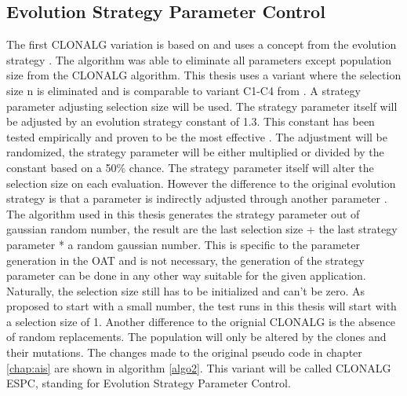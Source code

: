 \subsection{Evolution Strategy Parameter Control}
The first CLONALG variation is based on \cite{Garret04} and uses a concept from the evolution strategy \cite{evolution}. The algorithm was able to eliminate all parameters except population size from the CLONALG algorithm. This thesis uses a variant where the selection size n is eliminated and is comparable to variant C1-C4 from \cite{Garret04}. A strategy parameter adjusting selection size will be used. The strategy parameter itself will be adjusted by an evolution strategy constant of 1.3. This constant has been tested empirically and proven to be the most effective \cite{Garret04}. The adjustment will be randomized, the strategy parameter will be either multiplied or divided by the constant based on a 50\% chance. The strategy parameter itself will alter the selection size on each evaluation. However the difference to the original evolution strategy is that a parameter is indirectly adjusted through another parameter \cite{Garret04}. The algorithm used in this thesis generates the strategy parameter out of gaussian random number, the result are the last selection size + the last strategy parameter * a random gaussian number. This is specific to the parameter generation in the OAT and is not necessary, the generation of the strategy parameter can be done in any other way suitable for the given application.  Naturally, the selection size still has to be initialized and can't be zero. As \cite{Garret04} proposed to start with a small number, the test runs in this thesis will start with a selection size of 1. Another difference to the orignial CLONALG is the absence of random replacements. The population will only be altered by the clones and their mutations. The changes made to the original pseudo code in chapter \ref{chap:ais} are shown in algorithm \ref{algo2}. This variant will be called CLONALG ESPC, standing for Evolution Strategy Parameter Control.\\\\

